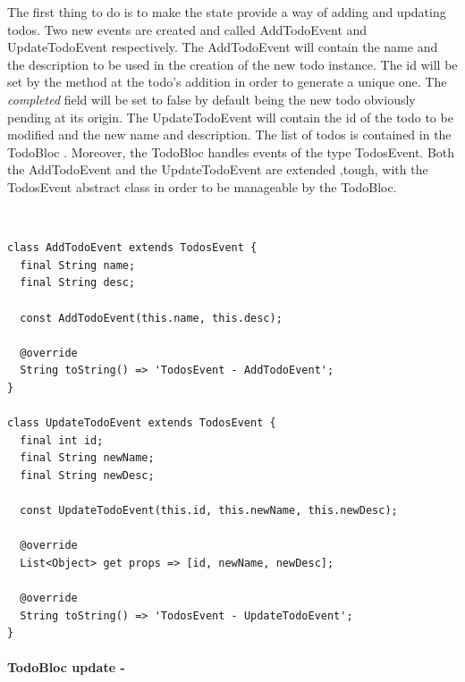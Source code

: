 The first thing to do is to make the state provide a way of adding and updating todos. Two new events are created and called AddTodoEvent and UpdateTodoEvent respectively. The AddTodoEvent will contain the name and the description to be used in the creation of the new todo instance. The id will be set by the method at the todo’s addition in order to generate a unique one. The \textit{completed} field will be set to false by default being the new todo obviously pending at its origin.  The UpdateTodoEvent will contain the id of the todo to be modified and the new name and description. The list of todos is contained in the TodoBloc . Moreover, the TodoBloc handles events of the type TodosEvent. Both the AddTodoEvent and the UpdateTodoEvent are extended ,tough, with the TodosEvent abstract class in order to be manageable by the TodoBloc.
\begin{code}
\mbox{}\\
 \mbox{}
\label{code:2.14}
\begin{verbatim}
class AddTodoEvent extends TodosEvent {
  final String name;
  final String desc;

  const AddTodoEvent(this.name, this.desc);

  @override
  String toString() => 'TodosEvent - AddTodoEvent';
}

class UpdateTodoEvent extends TodosEvent {
  final int id;
  final String newName;
  final String newDesc;

  const UpdateTodoEvent(this.id, this.newName, this.newDesc);

  @override
  List<Object> get props => [id, newName, newDesc];

  @override
  String toString() => 'TodosEvent - UpdateTodoEvent';
}
\end{verbatim}
\mbox{}
\end{code}
\paragraph{TodoBloc update - }
\label{subpar:todo_app_bloc_core_state}

